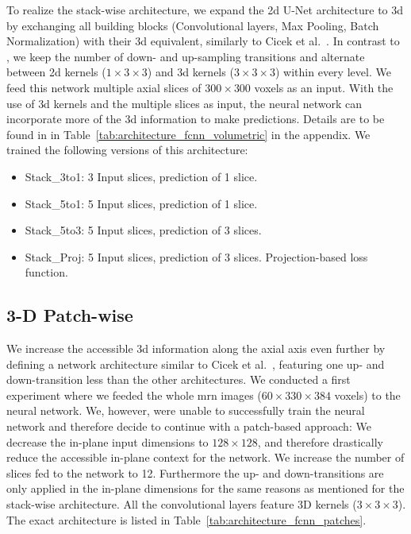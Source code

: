 To realize the stack-wise architecture, we expand the \gls{2d} U-Net architecture to \gls{3d} by exchanging all building blocks (Convolutional layers, Max Pooling, Batch Normalization) with their \gls{3d} equivalent, similarly to Cicek et al.~\cite{Cicek20163DAnnotation}. In contrast to \cite{Cicek20163DAnnotation}, we keep the number of down- and up-sampling transitions and alternate between \gls{2d} kernels ($1 \times 3 \times 3$) and \gls{3d} kernels ($3 \times 3 \times 3$) within every level.
We feed this network multiple axial slices of $300 \times 300$ voxels as an input.
With the use of \gls{3d} kernels and the multiple slices as input, the neural network can incorporate more of the \gls{3d} information to make predictions.
Details are to be found in in Table~\ref{tab:architecture_fcnn_volumetric} in the appendix. We trained the following versions of this architecture:
\begin{itemize}
  \item Stack\_3to1: 3 Input slices, prediction of 1 slice.
  \item Stack\_5to1: 5 Input slices, prediction of 1 slice.
  \item Stack\_5to3: 5 Input slices, prediction of 3 slices.
  \item Stack\_Proj: 5 Input slices, prediction of 3 slices. Projection-based loss function.
\end{itemize}


\subsection{3-D Patch-wise}
We increase the accessible \gls{3d} information along the axial axis even further by defining a network architecture similar to Cicek et al.~\cite{Cicek20163DAnnotation}, featuring one up- and down-transition less than the other architectures. We conducted a first experiment where we feeded the whole \gls{mrn} images ($60 \times 330 \times 384$ voxels) to the neural network. We, however, were unable to successfully train the neural network and therefore decide to continue with a patch-based approach: We decrease the in-plane input dimensions to $128 \times 128$, and therefore drastically reduce the accessible in-plane context for the network. We increase the number of slices fed to the network to 12. Furthermore the up- and down-transitions are only applied in the in-plane dimensions for the same reasons as mentioned for the stack-wise architecture. All the convolutional layers feature 3D kernels ($3 \times 3 \times 3$). The exact architecture is listed in Table~\ref{tab:architecture_fcnn_patches}.

